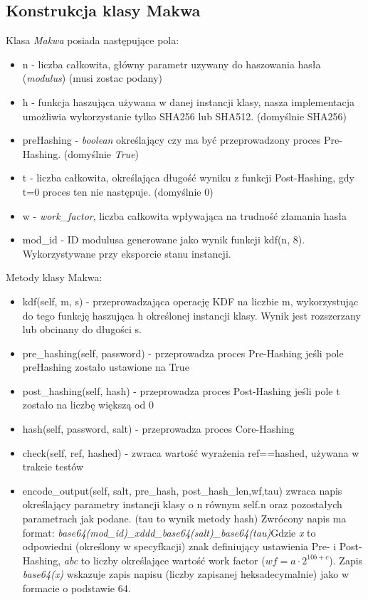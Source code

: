 \documentclass[a4paper,titleauthor]{mwart}
\begin{document}
\subsection{Konstrukcja klasy Makwa}
Klasa \textit{Makwa} posiada następujące pola:
\begin{itemize}
	\item n - liczba całkowita, główny parametr uzywany do haszowania hasła (\textit{modulus}) (musi zostac podany)
	\item h - funkcja haszująca używana w danej instancji klasy, nasza implementacja umożliwia wykorzystanie tylko SHA256 lub SHA512. (domyślnie SHA256)
	\item preHashing - \textit{boolean} określający czy ma być przeprowadzony proces Pre-Hashing. (domyślnie \textit{True})
	\item t - liczba całkowita, określająca długość wyniku z funkcji Post-Hashing, gdy t=0 proces ten nie następuje. (domyślnie 0)
	\item w - \textit{work\_factor}, liczba całkowita wpływająca na trudność złamania hasła
	\item mod\_id - ID modulusa generowane jako wynik funkcji kdf(n, 8). Wykorzystywane przy eksporcie stanu instancji.
\end{itemize}
Metody klasy Makwa:
\begin{itemize}
	\item kdf(self, m, s) - przeprowadzająca operację KDF na liczbie m, wykorzystując do tego funkcję haszująca h określonej instancji klasy. Wynik jest rozszerzany lub obcinany do długości s.
	\item pre\_hashing(self, password) - przeprowadza proces Pre-Hashing jeśli pole preHashing zostało ustawione na True
	\item post\_hashing(self, hash) - przeprowadza proces Post-Hashing jeśli pole t zostało na liczbę większą od 0
	\item hash(self, password, salt) - przeprowadza proces Core-Hashing
	\item check(self, ref, hashed) - zwraca wartość wyrażenia ref==hashed, używana w trakcie testów
	\item encode\_output(self, salt, pre\_hash, post\_hash\_len,wf,tau) zwraca napis określający parametry instancji klasy o n równym self.n oraz pozostałych parametrach jak podane. (tau to wynik metody hash)
	Zwrócony napis ma format: \textit{base64(mod\_id)\_xddd\_base64(salt)\_base64(tau)}Gdzie \textit{x} to odpowiedni (określony w specyfkacji) znak definiujący ustawienia Pre- i Post- Hashing, \textit{abc} to liczby określające wartość work factor ($wf=a\cdot 2^{10b + c}$). Zapis \textit{base64(x)} wskazuje zapis napisu (liczby zapisanej heksadecymalnie) jako w formacie o podstawie 64.
\end{itemize}
\end{document}
